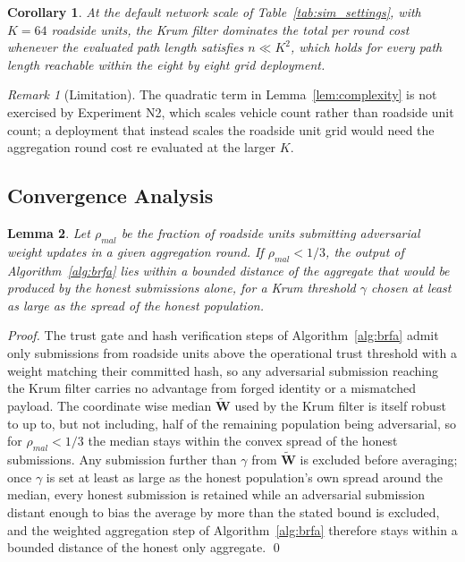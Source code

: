 \documentclass[lettersize,journal]{IEEEtran}
\theoremstyle{plain}
\newtheorem{lemma}{Lemma}
\newtheorem{corollary}[lemma]{Corollary}
\theoremstyle{remark}
\newtheorem{remark}{Remark}
\begin{document}
	\begin{corollary}
		At the default network scale of Table~\ref{tab:sim_settings}, with
		$K{=}64$ roadside units, the Krum filter dominates the total per
		round cost whenever the evaluated path length satisfies
		$n \ll K^2$, which holds for every path length reachable within
		the eight by eight grid deployment.
	\end{corollary}
	
	\begin{remark}[Limitation]
		The quadratic term in Lemma~\ref{lem:complexity} is not exercised
		by Experiment N2, which scales vehicle count rather than roadside
		unit count; a deployment that instead scales the roadside unit
		grid would need the aggregation round cost re evaluated at the
		larger $K$.
	\end{remark}
	
	
	\subsection{Convergence Analysis}\label{app:convergence}
	
	\begin{lemma}
		\label{lem:convergence}
		Let $\rho_{mal}$ be the fraction of roadside units submitting
		adversarial weight updates in a given aggregation round. If
		$\rho_{mal} < 1/3$, the output of Algorithm~\ref{alg:brfa} lies
		within a bounded distance of the aggregate that would be produced
		by the honest submissions alone, for a Krum threshold $\gamma$
		chosen at least as large as the spread of the honest population.
	\end{lemma}
	\begin{proof}
		The trust gate and hash verification steps of
		Algorithm~\ref{alg:brfa} admit only submissions from roadside
		units above the operational trust threshold with a weight matching
		their committed hash, so any adversarial submission reaching the
		Krum filter carries no advantage from forged identity or a
		mismatched payload. The coordinate wise median
		$\tilde{\mathbf{W}}$ used by the Krum filter is itself robust to
		up to, but not including, half of the remaining population being
		adversarial, so for $\rho_{mal}<1/3$ the median stays within the
		convex spread of the honest submissions. Any submission further
		than $\gamma$ from $\tilde{\mathbf{W}}$ is excluded before
		averaging; once $\gamma$ is set at least as large as the honest
		population's own spread around the median, every honest submission
		is retained while an adversarial submission distant enough to bias
		the average by more than the stated bound is excluded, and the
		weighted aggregation step of Algorithm~\ref{alg:brfa} therefore stays
		within a bounded distance of the honest only aggregate.
		\qed
	\end{proof}
	
\end{document}
